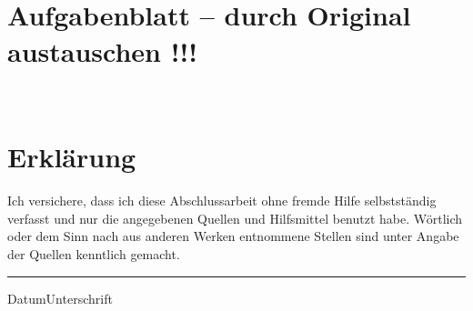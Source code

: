 
\maketitle
\clearpage
~
\newpage



\clearpage

    {

    }
    {
      ~
      \newpage
      \vfill
      \section*{Aufgabenblatt -- durch Original austauschen !!!}
      \vfill
      \clearpage
      ~
      \newpage
    }
\vspace{10ex}
\section*{Erklärung}
Ich  versichere, dass  ich diese  Abschlussarbeit ohne  fremde  Hilfe selbstständig
verfasst und  nur die  angegebenen Quellen und  Hilfsmittel benutzt  habe. Wörtlich
oder dem  Sinn nach  aus anderen  Werken entnommene Stellen  sind unter  Angabe der
Quellen kenntlich gemacht.
\vspace{10ex}\\

\hrule
{\small{Datum}}\hfill{\small{Unterschrift}}


\tableofcontents
\listoffigures



